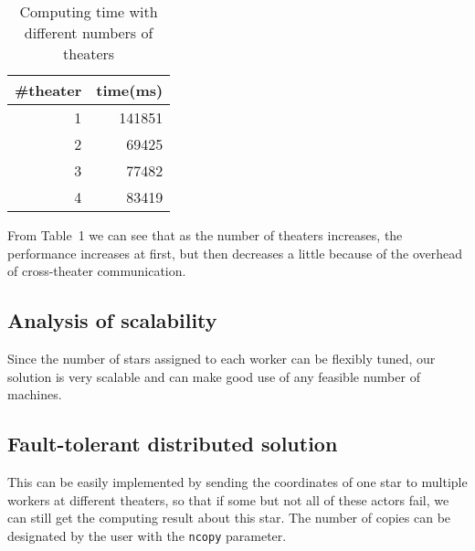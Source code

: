 \documentclass[12pt,letterpaper]{article}
\begin{document}
\begin{table}
\begin{center}
\caption{Computing time with different numbers of theaters}
\begin{tabular}{r|r}
\#theater & time(ms)\\
\hline
1 & 141851\\
2 & 69425\\
3 & 77482\\
4 & 83419\\
\end{tabular}
\end{center}
\end{table}
From Table~1 we can see that as the number of theaters increases, the performance increases at first, but then decreases a little because of the overhead of cross-theater communication.

\subsection*{Analysis of scalability}
Since the number of stars assigned to each worker can be flexibly tuned, our solution is very scalable and can make good use of any feasible number of machines.

\subsection*{Fault-tolerant distributed solution}
This can be easily implemented by sending the coordinates of one star to multiple workers at different theaters, so that if some but not all of these actors fail, we can still get the computing result about this star. The number of copies can be designated by the user with the \texttt{ncopy} parameter.
\end{document}
